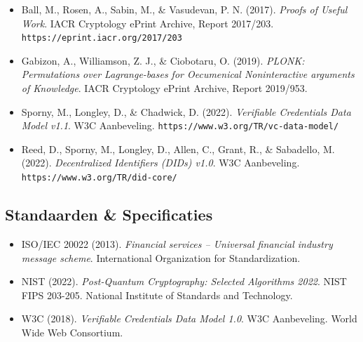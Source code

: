\documentclass[11pt]{article}
\begin{document}
\begin{itemize}[leftmargin=*, label={}]
  \item Ball, M., Rosen, A., Sabin, M., \& Vasudevan, P. N. (2017). \textit{Proofs of Useful Work}. IACR Cryptology ePrint Archive, Report 2017/203. \texttt{https://eprint.iacr.org/2017/203}

  \item Gabizon, A., Williamson, Z. J., \& Ciobotaru, O. (2019). \textit{PLONK: Permutations over Lagrange-bases for Oecumenical Noninteractive arguments of Knowledge}. IACR Cryptology ePrint Archive, Report 2019/953.

  \item Sporny, M., Longley, D., \& Chadwick, D. (2022). \textit{Verifiable Credentials Data Model v1.1}. W3C Aanbeveling. \texttt{https://www.w3.org/TR/vc-data-model/}

  \item Reed, D., Sporny, M., Longley, D., Allen, C., Grant, R., \& Sabadello, M. (2022). \textit{Decentralized Identifiers (DIDs) v1.0}. W3C Aanbeveling. \texttt{https://www.w3.org/TR/did-core/}
\end{itemize}

\subsection*{Standaarden \& Specificaties}

\begin{itemize}[leftmargin=*, label={}]
  \item ISO/IEC 20022 (2013). \textit{Financial services -- Universal financial industry message scheme}. International Organization for Standardization.

  \item NIST (2022). \textit{Post-Quantum Cryptography: Selected Algorithms 2022}. NIST FIPS 203-205. National Institute of Standards and Technology.

  \item W3C (2018). \textit{Verifiable Credentials Data Model 1.0}. W3C Aanbeveling. World Wide Web Consortium.
\end{itemize}
\end{document}
